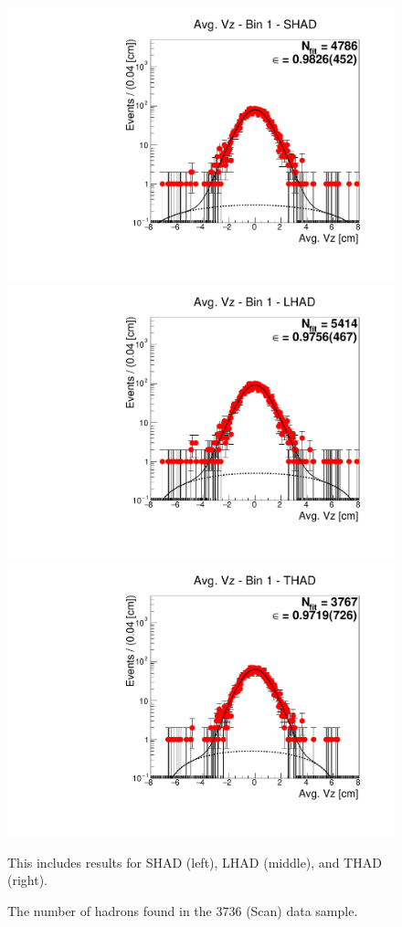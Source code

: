 \begin{figure}[H]
\centering
\includegraphics[scale=0.25]{figures/plots/nonDDbar_fit_results/scan/fit_scan_01_data_SHAD.pdf}
\hspace{-0.5cm}
\includegraphics[scale=0.25]{figures/plots/nonDDbar_fit_results/scan/fit_scan_01_data_LHAD.pdf}
\hspace{-0.5cm}
\includegraphics[scale=0.25]{figures/plots/nonDDbar_fit_results/scan/fit_scan_01_data_THAD.pdf}
\caption{The number of hadrons found in the 3736 (Scan) data sample.}
{This includes results for SHAD (left), LHAD (middle), and THAD (right).}
\label{fig:hadron_fits_scan_01}
\end{figure}

